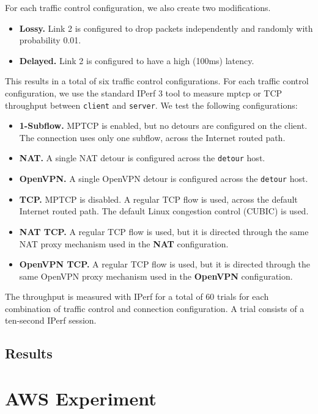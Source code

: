 \documentclass{cwru}
\begin{document}
For each traffic control configuration, we also create two modifications.

\begin{itemize}
\item \textbf{Lossy.} Link 2 is configured to drop packets independently and
  randomly with probability 0.01.
\item \textbf{Delayed.} Link 2 is configured to have a high (100ms) latency.
\end{itemize}

This results in a total of six traffic control configurations. For each traffic
control configuration, we use the standard IPerf 3 tool to measure \ac{mptcp} or
TCP throughput between \texttt{client} and \texttt{server}. We test the
following configurations:

\begin{itemize}
\item \textbf{1-Subflow.} MPTCP is enabled, but no detours are configured on the
  client. The connection uses only one subflow, across the Internet routed path.
\item \textbf{NAT.} A single NAT detour is configured across the \texttt{detour}
  host.
\item \textbf{OpenVPN.} A single OpenVPN detour is configured across the
  \texttt{detour} host.
\item \textbf{TCP.} MPTCP is disabled. A regular TCP flow is used, across the
  default Internet routed path. The default Linux congestion control (CUBIC) is
  used.
\item \textbf{NAT TCP.} A regular TCP flow is used, but it is directed through
  the same NAT proxy mechanism used in the \textbf{NAT} configuration.
\item \textbf{OpenVPN TCP.} A regular TCP flow is used, but it is directed
  through the same OpenVPN proxy mechanism used in the \textbf{OpenVPN}
  configuration.
\end{itemize}

The throughput is measured with IPerf for a total of 60 trials for each
combination of traffic control and connection configuration. A trial consists of
a ten-second IPerf session.

\subsection{Results}


\section{AWS Experiment}
\end{document}
